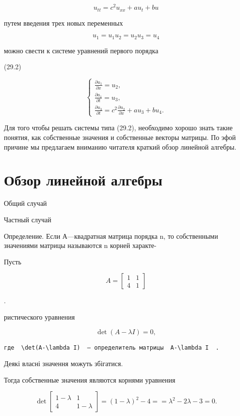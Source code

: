 \documentclass[
  ukrainian,
]{article}
\begin{document}
\[
u_{tt} = c^2 u_{xx} + a u_t + b u
\]

путем введения трех новых переменных

\[
u_1 = u_1
u_2 = u_2
u_3 = u_4
\]

можно свести к системе уравнений первого порядка

(29.2)

\[
\begin{cases} \frac{\partial u_1}{\partial x} = u_2, \\ \frac{\partial a_1}{\partial t} = u_3, \\ \frac{\partial u_3}{\partial t} = c^2 \frac{\partial u_2}{\partial x} + au_3 + bu_4. \end{cases}
\]

Для того чтобы решать системы типа (29.2), необходимо хорошо знать такие
понятия, как собственные значения и собственные векторы матрицы. По эфой
причине мы предлагаем вниманию читателя краткий обзор линейной алгебры.

\section{Обзор линейной
алгебры}\label{ux43eux431ux437ux43eux440-ux43bux438ux43dux435ux439ux43dux43eux439-ux430ux43bux433ux435ux431ux440ux44b}

Общий случай

Частный случай

Определение. Если А---квадратная матрица порядка n, то собственными
значениями матрицы называются n корней характе-

Пусть

\[
A =
\begin{bmatrix} 1 & 1 \\ 4 & 1 \end{bmatrix}
\]

.

ристического уравнения

\[
\det\left(A-\lambda I\right)=0,
\]

\begin{verbatim}
где  \det(A-\lambda I)  — определитель матрицы  A-\lambda I  .
\end{verbatim}

Деякі власні значення можуть збігатися.

Тогда собственные значения являются корнями уравнения

\[
\det
\begin{bmatrix} 1-\lambda & 1\\ 4 & 1-\lambda \end{bmatrix}
= (1-\lambda)^2 - 4 =
= \lambda^2 - 2\lambda - 3 = 0.
\]
\end{document}
